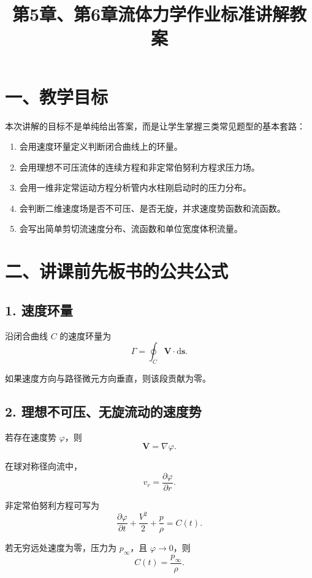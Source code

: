 ﻿\documentclass[12pt,a4paper]{ctexart}
\title{第5章、第6章流体力学作业标准讲解教案}
\author{}
\date{}
\newcommand{\dd}{\mathrm d}
\newcommand{\pinf}{p_\infty}
\newcommand{\grad}{\nabla}
\begin{document}
\maketitle

\section*{一、教学目标}

本次讲解的目标不是单纯给出答案，而是让学生掌握三类常见题型的基本套路：

\begin{enumerate}
  \item 会用速度环量定义判断闭合曲线上的环量。
  \item 会用理想不可压流体的连续方程和非定常伯努利方程求压力场。
  \item 会用一维非定常运动方程分析管内水柱刚启动时的压力分布。
  \item 会判断二维速度场是否不可压、是否无旋，并求速度势函数和流函数。
  \item 会写出简单剪切流速度分布、流函数和单位宽度体积流量。
\end{enumerate}

\section*{二、讲课前先板书的公共公式}

\subsection*{1. 速度环量}

沿闭合曲线 $C$ 的速度环量为
\[
\Gamma=\oint_C \bm V\cdot \dd \bm s .
\]

如果速度方向与路径微元方向垂直，则该段贡献为零。

\subsection*{2. 理想不可压、无旋流动的速度势}

若存在速度势 $\varphi$，则
\[
\bm V=\grad \varphi .
\]

在球对称径向流中，
\[
v_r=\frac{\partial \varphi}{\partial r}.
\]

非定常伯努利方程可写为
\[
\frac{\partial \varphi}{\partial t}
+\frac{V^2}{2}
+\frac{p}{\rho}
=C(t).
\]

若无穷远处速度为零，压力为 $\pinf$，且 $\varphi\to0$，则
\[
C(t)=\frac{\pinf}{\rho}.
\]
\end{document}
